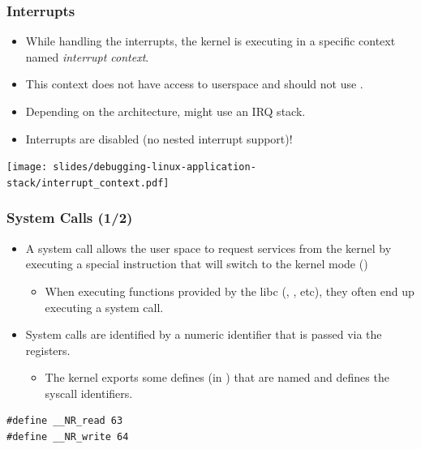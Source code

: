 \begin{frame}
  \frametitle{Interrupts}
  \begin{itemize}
    \item While handling the interrupts, the kernel is executing in a
          specific context named {\em interrupt context}.
    \item This context does not have access to userspace and should not use
          .
    \item Depending on the architecture, might use an IRQ stack.
    \item Interrupts are disabled (no nested interrupt support)!
  \end{itemize}
  \begin{center}
    \texttt{[image: slides/debugging-linux-application-stack/interrupt\_context.pdf]}
  \end{center}
\end{frame}

\begin{frame}[fragile]
  \frametitle{System Calls (1/2)}
  \begin{itemize}
    \item A system call allows the user space to request services from the
          kernel by executing a special instruction that will switch to the
          kernel mode ()
    \begin{itemize}
      \item When executing functions provided by the libc (,
            , etc), they often end up executing a system call.
    \end{itemize}
    \item System calls are identified by a numeric identifier that is passed
          via the registers.
    \begin{itemize}
      \item The kernel exports some defines (in ) that are named
             and defines the syscall identifiers.
    \end{itemize}
  \end{itemize}
  \begin{block}{}
    \begin{verbatim}
#define __NR_read 63
#define __NR_write 64
    \end{verbatim}
  \end{block}
\end{frame}

